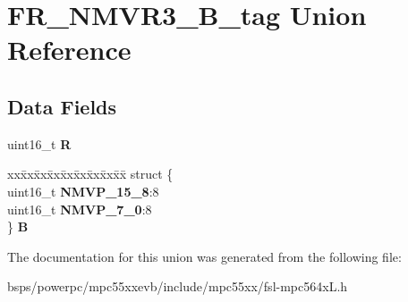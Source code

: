 \hypertarget{unionFR__NMVR3__16B__tag}{}\section{F\+R\+\_\+\+N\+M\+V\+R3\+\_\+B\+\_\+tag Union Reference}
\label{unionFR__NMVR3__16B__tag}
\subsection*{Data Fields}
\begin{DoxyCompactItemize}
\item 
\mbox{\label{unionFR__NMVR3__16B__tag_a8cd7ea71053321a8f8f1ee25dc00e74e}} 
uint16\+\_\+t {\bfseries R}
\item 
\mbox{\label{unionFR__NMVR3__16B__tag_a0e37874a6943dd3f6749dcdf8d15741a}} 
\begin{tabbing}
xx\=xx\=xx\=xx\=xx\=xx\=xx\=xx\=xx\=\kill
struct \{\\
\>uint16\_t {\bfseries NMVP\_15\_8}:8\\
\>uint16\_t {\bfseries NMVP\_7\_0}:8\\
\} {\bfseries B}\\

\end{tabbing}\end{DoxyCompactItemize}


The documentation for this union was generated from the following file\+:\begin{DoxyCompactItemize}
\item 
bsps/powerpc/mpc55xxevb/include/mpc55xx/fsl-\/mpc564x\+L.\+h\end{DoxyCompactItemize}
